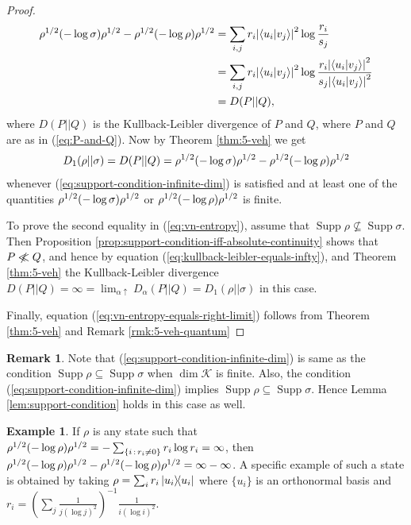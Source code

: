 \documentclass[12pt,a4paper,oneside]{article}
\numberwithin{equation}{section}
\theoremstyle{definition}  %
\newtheorem{eg}[defn]{Example}
\newtheorem{rmk}[defn]{Remark}
\theoremstyle{plain}  %
\theoremstyle{remark} %
\newcommand{\CK}{\mathcal{K}}
\newcommand{\nll}{\centernot{\ll}}
\let\tr\relax
\DeclareMathOperator{\tr}{Tr}
\DeclareMathOperator{\supp}{Supp}
\begin{document}
\begin{proof}
    \begin{align*}
       \tr \rho^{1/2}(-\log\sigma)\rho^{1/2}-\tr\rho^{1/2}(-\log\rho)\rho^{1/2}
    & =\sum_{i,j}r_i\abs{\braket{u_i}{v_j}}^2\log\frac{r_i}{s_j}\\
    &= \sum_{i,j}r_i\abs{\braket{u_i}{v_j}}^2\log\frac{r_i\abs{\braket{u_i}{v_j}}^2}{s_j\abs{\braket{u_i}{v_j}}^2}\\
    &= D(P||Q),
\end{align*}where $D(P||Q)$ is the Kullback-Leibler divergence   of $P$ and $Q$,
where $P$ and $Q$ are as in (\ref{eq:P-and-Q}).  Now by 
Theorem \ref{thm:5-veh} we get
\begin{align*}
    D_1(\rho||\sigma) = D(P||Q) = \tr \rho^{1/2}(-\log\sigma)\rho^{1/2}-\tr\rho^{1/2}(-\log\rho)\rho^{1/2} 
\end{align*}
whenever (\ref{eq:support-condition-infinite-dim}) is satisfied and at least one of the quantities $\tr \rho^{1/2}(-\log\sigma)\rho^{1/2}$ or $\tr\rho^{1/2}(-\log\rho)\rho^{1/2}$ is finite.


To prove the second equality in (\ref{eq:vn-entropy}), assume that $\supp \rho \nsubseteq \supp \sigma$. Then Proposition \ref{prop:support-condition-iff-absolute-continuity} shows that $P\nll Q$, and hence  by equation (\ref{eq:kullback-leibler-equals-infty}), and Theorem \ref{thm:5-veh} the Kullback-Leibler divergence $D(P||Q) = \infty = \lim_{\alpha\uparrow} D_\alpha(P||Q) = D_1(\rho||\sigma)$ in this case.

Finally, equation (\ref{eq:vn-entropy-equals-right-limit}) follows from Theorem \ref{thm:5-veh} and Remark \ref{rmk:5-veh-quantum}
\end{proof}
 \begin{rmk}
\label{rmk:support-condition}
 Note that (\ref{eq:support-condition-infinite-dim}) is same as the condition $\supp\rho\subseteq\supp\sigma$ when $\dim \CK $ is finite. Also, the condition (\ref{eq:support-condition-infinite-dim}) implies $\supp\rho\subseteq\supp\sigma$. Hence Lemma \ref{lem:support-condition} holds  in this case as well.
 \end{rmk}
\begin{eg}\label{eg:infty-infty} If $\rho$ is any state such that $\tr \rho^{1/2}(-\log\rho)\rho^{1/2} = -\sum_{\{i\,:\, r_i\neq 0\}} r_i \log r_i= \infty$, then $ \tr \rho^{1/2}(-\log\rho)\rho^{1/2}-\tr\rho^{1/2}(-\log\rho)\rho^{1/2}= \infty -\infty$. A specific example of such a state is obtained by taking $\rho = \sum_{i}r_i\ketbra{u_i}{u_i}$ where $\{u_i\}$ is an orthonormal basis and  $r_i=\left(\sum_j \frac{1}{j(\log j)^2} \right)^{-1} \frac{1}{i(\log i)^2}$.
\end{eg}
\end{document}
